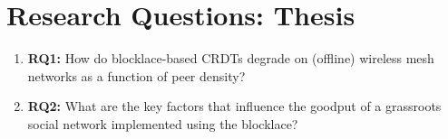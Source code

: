 \section{Research Questions: Thesis}

\begin{frame}
    \begin{enumerate}
        \item \textbf{RQ1:} How do blocklace-based CRDTs degrade on (offline) wireless mesh networks as a function of peer density?
        \item \textbf{RQ2:} What are the key factors that influence the goodput of a grassroots social network implemented using the blocklace?
    \end{enumerate}
\end{frame}